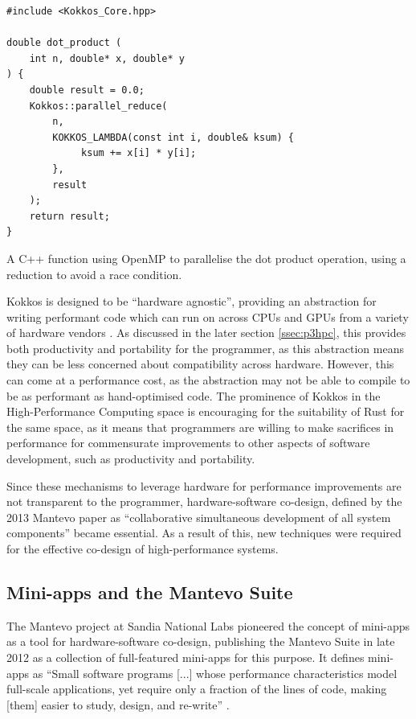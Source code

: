 \begin{listing}[H]
    \begin{verbatim}
#include <Kokkos_Core.hpp>

double dot_product (
    int n, double* x, double* y
) {
    double result = 0.0;
    Kokkos::parallel_reduce(
        n,
        KOKKOS_LAMBDA(const int i, double& ksum) {
             ksum += x[i] * y[i];
        },
        result
    );
    return result;
}
    \end{verbatim}
    \caption{A C++ function using OpenMP to parallelise the dot product operation, using a reduction to avoid a race condition.}
    \label{listing:cpp-ddot-openmp-reduction}
\end{listing}

Kokkos is designed to be ``hardware agnostic'', providing an abstraction for writing performant code which can run on across CPUs and GPUs from a variety of hardware vendors \cite{KokkosEcosystem}. As discussed in the later section \ref{ssec:p3hpc}, this provides both productivity and portability for the programmer, as this abstraction means they can be less concerned about compatibility across hardware. However, this can come at a performance cost, as the abstraction may not be able to compile to be as performant as hand-optimised code. The prominence of Kokkos in the High-Performance Computing space is encouraging for the suitability of Rust for the same space, as it means that programmers are willing to make sacrifices in performance for commensurate improvements to other aspects of software development, such as productivity and portability.

Since these mechanisms to leverage hardware for performance improvements are not transparent to the programmer, hardware-software co-design, defined by the 2013 Mantevo paper as ``collaborative simultaneous development of all system components'' \cite{heroux2013mantevo} became essential. As a result of this, new techniques were required for the effective co-design of high-performance systems.

\subsection{Mini-apps and the Mantevo Suite}
\label{ssec:miniapps-mantevo} %

The Mantevo project at Sandia National Labs pioneered the concept of mini-apps as a tool for hardware-software co-design, publishing the Mantevo Suite in late 2012 as a collection of full-featured mini-apps for this purpose. It defines mini-apps as ``Small software programs [...] whose performance characteristics model full-scale applications, yet require only a fraction of the lines of code, making [them] easier to study, design, and re-write'' \cite{heroux2013mantevo}.

